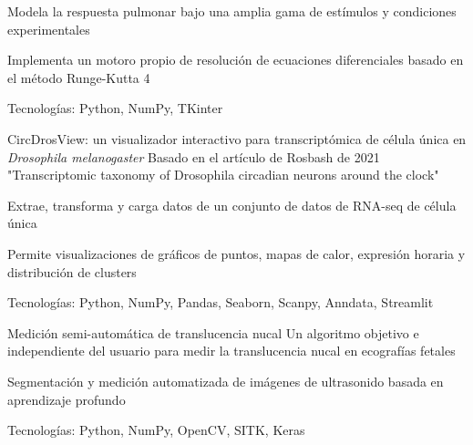 \documentclass{resume}
\begin{document}
    \resumeItemListStart
    \item {Modela la respuesta pulmonar bajo una amplia gama de estímulos y condiciones experimentales}
    \item {Implementa un motoro propio de resolución de ecuaciones diferenciales basado en el método Runge-Kutta 4}
    \item {Tecnologías: Python, NumPy, TKinter}
    \resumeItemListEnd

    \resumeProject
    {CircDrosView: un visualizador interactivo para transcriptómica de célula única en \textit{Drosophila melanogaster}}
    {Basado en el artículo de Rosbash de 2021
    "Transcriptomic taxonomy of Drosophila circadian neurons around the clock"}
    {} %

    \resumeItemListStart
    \item {Extrae, transforma y carga datos de un conjunto de datos de RNA-seq de célula única}
    \item {Permite visualizaciones de gráficos de puntos, mapas de calor, expresión horaria y distribución de clusters}
    \item {Tecnologías: Python, NumPy, Pandas, Seaborn, Scanpy, Anndata, Streamlit}
    \resumeItemListEnd

    \resumeProject
    {Medición semi-automática de translucencia nucal} %
    {Un algoritmo objetivo e independiente del usuario para medir la translucencia nucal en ecografías fetales}
    {} %

    \resumeItemListStart
    \item
    {Segmentación y medición automatizada de imágenes de ultrasonido basada en aprendizaje profundo}
    \item {Tecnologías: Python, NumPy, OpenCV, SITK, Keras}
    \resumeItemListEnd

    \resumeSubHeadingListEnd


    \vspace{-5mm}
\end{document}
